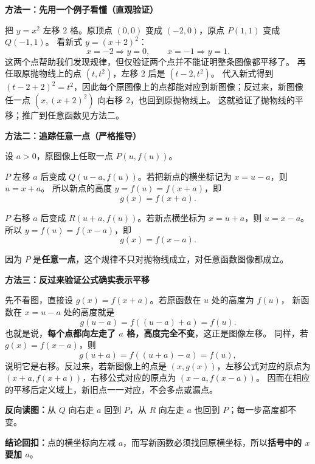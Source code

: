 \begin{proofbox}
  \textbf{\textcolor{CProof}{方法一：先用一个例子看懂（直观验证）}}

  把 $y=x^2$ 左移 $2$ 格。原顶点 $(0,0)$ 变成 $(-2,0)$，原点 $P(1,1)$ 变成 $Q(-1,1)$。
  看新式 $y=(x+2)^2$：
  \[
     x=-2\Rightarrow y=0,\qquad x=-1\Rightarrow y=1.
  \]
  这两个点帮助我们发现规律，但仅验证两个点并不能证明整条图像都平移了。
  再任取原抛物线上的点 $(t,t^2)$，左移 $2$ 后是 $(t-2,t^2)$。
  代入新式得到 $(t-2+2)^2=t^2$，因此每个原图像上的点都能对应到新图像；反过来，新图像任一点 $(x,(x+2)^2)$ 向右移 $2$，也回到原抛物线上。
  这就验证了抛物线的平移；推广到任意函数见方法二。
  \begin{center}
  
  \end{center}

  \medskip
  \textbf{\textcolor{CProof}{方法二：追踪任意一点（严格推导）}}

  设 $a>0$，原图像上任取一点 $P(u,f(u))$。
  \begin{description}[style=nextline,leftmargin=2.6em,labelsep=0.5em,itemsep=0.4em]
    \item[\textbf{左移：}] $P$ 左移 $a$ 后变成 $Q(u-a,f(u))$。若把新点的横坐标记为 $x=u-a$，则 $u=x+a$。
      所以新点的高度 $y=f(u)=f(x+a)$，即
      \[\boxed{g(x)=f(x+a)}.\]
    \item[\textbf{右移：}] $P$ 右移 $a$ 后变成 $R(u+a,f(u))$。若新点横坐标为 $x=u+a$，则 $u=x-a$。
      所以 $y=f(u)=f(x-a)$，即
      \[\boxed{g(x)=f(x-a)}.\]
  \end{description}
  因为 $P$ 是\textbf{任意一点}，这个规律不只对抛物线成立，对任意函数图像都成立。
  \begin{center}
  
  \end{center}

  \medskip
  \textbf{\textcolor{CProof}{方法三：反过来验证公式确实表示平移}}

  先不看图，直接设 $g(x)=f(x+a)$。若原函数在 $u$ 处的高度为 $f(u)$，
  新函数在 $x=u-a$ 处的高度就是
  \[
     g(u-a)=f((u-a)+a)=f(u).
  \]
  也就是说，\textbf{每个点都向左走了 $a$ 格，高度完全不变}，这正是图像左移。
  同样，若 $g(x)=f(x-a)$，则
  \[
    g(u+a)=f((u+a)-a)=f(u),
  \]
  说明它是右移。反过来，若新图像上的点是 $(x,g(x))$，左移公式对应的原点为 $(x+a,f(x+a))$，右移公式对应的原点为 $(x-a,f(x-a))$。
  因而在相应的平移后定义域上，新旧点一一对应，不会多点或漏点。
  \begin{center}
  
  \end{center}
  \textbf{反向读图：}从 $Q$ 向右走 $a$ 回到 $P$，从 $R$ 向左走 $a$ 也回到 $P$；每一步高度都不变。

  \textbf{\textcolor{CProof}{结论回扣：}}点的横坐标向左减 $a$，而写新函数必须找回原横坐标，所以\textbf{括号中的 $x$ 要加 $a$}。
\end{proofbox}

